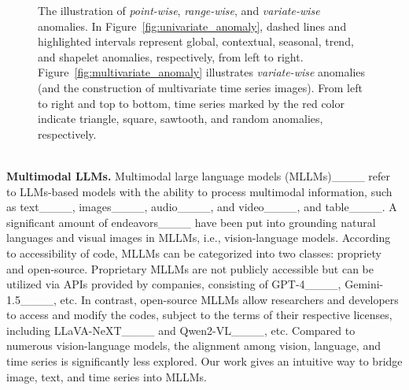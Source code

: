 \begin{figure*}[th!]
    \centering
    \vspace{-0.3cm}
    \hspace{-0.2cm}
    \vspace{-0.3cm}
    \caption{The illustration of \textit{point-wise}, \textit{range-wise}, and \textit{variate-wise} anomalies. In Figure~\ref{fig:univariate_anomaly}, dashed lines and highlighted intervals represent global, contextual, seasonal, trend, and shapelet anomalies, respectively, from left to right. Figure~\ref{fig:multivariate_anomaly} illustrates \textit{variate-wise} anomalies (and the construction of multivariate time series images). From left to right and top to bottom, time series marked by the red color indicate triangle, square, sawtooth, and random anomalies, respectively.}
    \label{fig:anomaly}
    \vspace{-0.5cm}
\end{figure*}
\\\textbf{Multimodal LLMs.}
Multimodal large language models (MLLMs)____ refer to LLMs-based models with the ability to process multimodal information, such as text____, images____, audio____, and video____, and table____. A significant amount of endeavors____ have been put into grounding natural languages and visual images in MLLMs, i.e., vision-language models. According to accessibility of code, MLLMs can be categorized into two classes: propriety and open-source. Proprietary MLLMs are not publicly accessible but can be utilized via APIs provided by companies, consisting of GPT-4____, Gemini-1.5____, etc. In contrast, open-source MLLMs allow researchers and developers to access and modify the codes, subject to the terms of their respective licenses, including LLaVA-NeXT____ and Qwen2-VL____, etc. Compared to numerous vision-language models, the alignment among vision, language, and time series is significantly less explored. Our work gives an intuitive way to bridge image, text, and time series into MLLMs.